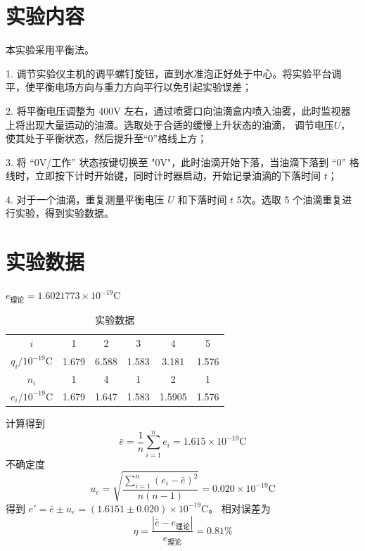 \documentclass[12pt]{article}
\begin{document}
\section{实验内容}
本实验采用平衡法。

1. 调节实验仪主机的调平螺钉旋钮，直到水准泡正好处于中心。将实验平台调平，使平衡电场方向与重力方向平行以免引起实验误差；

2. 将平衡电压调整为 400V 左右，通过喷雾口向油滴盒内喷入油雾，此时监视器上将出现大量运动的油滴。选取处于合适的缓慢上升状态的油滴，
调节电压$U$，使其处于平衡状态，然后提升至“0”格线上方；

3. 将 “0V/工作” 状态按键切换至 "0V"，此时油滴开始下落，当油滴下落到 “0” 格线时，立即按下计时开始键，同时计时器启动，开始记录油滴的下落时间 $t$；

4. 对于一个油滴，重复测量平衡电压 $U$ 和下落时间 $t$ 5次。选取 5 个油滴重复进行实验，得到实验数据。

\section{实验数据}

\begin{table}[H]
    \centering
    \caption{实验数据}
    \begin{minipage}{0.7\textwidth}
        \raggedleft
        $e_{理论}=1.6021773\times 10^{-19}\mathrm C$
    \end{minipage}
    \begin{tabular}{cccccc}
        \hline\hline
        $i$                                 & 1                    & 2                    & 3                    & 4                    & 5                    \\
        $q_i/10^{-19}\mathrm C$             & 1.679                  &  6.588      & 1.583   & 3.181       &     1.576     \\
        $n_i$                               & 1                     &   4          &     1        &     2      & 1                     \\
        $e_i/10^{-19}\mathrm C$ & 1.679 &  1.647 & 1.583 & 1.5905 & 1.576 \\
        \hline\hline
    \end{tabular}
\end{table}
计算得到
\begin{equation}
    \bar e=\frac{1}{n}\sum_{i=1}^{n} e_i=1.615\times 10^{-19}\mathrm C
\end{equation}
不确定度
\begin{equation}
    u_e=\sqrt{\dfrac{\sum_{i=1}^n(e_i-\bar e)^2}{n(n-1)}}=0.020 \times 10^{-19}\mathrm C
\end{equation}
得到 $e'=\bar e\pm u_e=(1.6151\pm 0.020) \times 10^{-19}\mathrm C$。
相对误差为
\begin{equation}
    \eta=\frac{|\bar e-e_{理论}|}{e_{理论}}=0.81\%
\end{equation}
\end{document}
